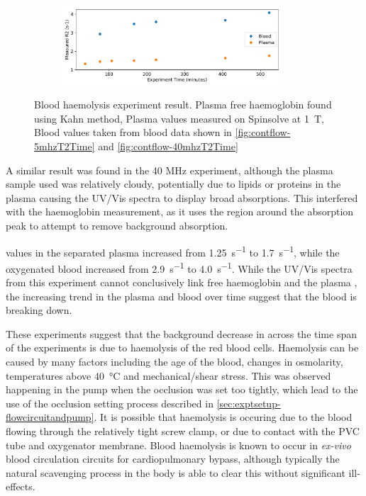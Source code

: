 \begin{figure}[h!tp]
\begin{subfigure}{\textwidth}
\includegraphics[width=0.9\textwidth]{figures/contflow/40haemolysePlasT2.pdf}
\end{subfigure}
\caption[Blood haemolysis experiment result]{Blood haemolysis experiment result. Plasma free haemoglobin found using Kahn method, Plasma \Rtwo values measured on Spinsolve at \SI{1}{T}, Blood \Rtwo values taken from blood data shown in \autoref{fig:contflow-5mhzT2Time} and \autoref{fig:contflow-40mhzT2Time}}
\label{fig:contflow-haemolyseResult}
\end{figure}

A similar result was found in the 40 MHz experiment, although the plasma sample used was relatively cloudy, potentially due to lipids or proteins in the plasma causing the UV/Vis spectra to display broad absorptions.
This interfered with the haemoglobin measurement, as it uses the region around the absorption peak to attempt to remove background absorption.

\Rtwo values in the separated plasma increased from \SI{1.25}{s^{-1}} to \SI{1.7}{s^{-1}}, while the oxygenated blood increased from \SI{2.9}{s^{-1}} to \SI{4.0}{s^{-1}}.
While the UV/Vis spectra from this experiment cannot conclusively link free haemoglobin and the plasma \Rtwo, the increasing trend in the plasma \Rtwo and blood \Rtwo over time suggest that the blood is breaking down.

These experiments suggest that the background decrease in \Ttwo across the time span of the experiments is due to haemolysis of the red blood cells.
Haemolysis can be caused by many factors including the age of the blood, changes in osmolarity, temperatures above \SI{40}{\celsius} and mechanical/shear stress\cite{Sowemimo-CokerRedbloodcell2002}.
This was observed happening in the pump when the occlusion was set too tightly, which lead to the use of the occlusion setting process described in \autoref{sec:exptsetup-flowcircuitandpump}.
It is possible that haemolysis is occuring due to the blood flowing through the relatively tight screw clamp, or due to contact with the PVC tube and oxygenator membrane.
Blood haemolysis is known to occur in \textit{ex-vivo} blood circulation circuits for cardiopulmonary bypass, although typically the natural scavenging process in the body is able to clear this without significant ill-effects\cite{VercaemstHemolysiscardiacsurgery2008}.

